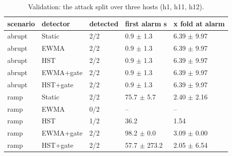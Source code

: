\begin{table}[t]
\centering\small
\caption{Validation: the attack split over three hosts (h1, h11, h12).}\label{tab:distributed}
\begin{tabular}{lllll}
\toprule
scenario & detector & detected & first alarm s & x fold at alarm \\
\midrule
abrupt & Static & 2/2 & 0.9 $\pm$ 1.3 & 6.39 $\pm$ 9.97 \\
abrupt & EWMA & 2/2 & 0.9 $\pm$ 1.3 & 6.39 $\pm$ 9.97 \\
abrupt & HST & 2/2 & 0.9 $\pm$ 1.3 & 6.39 $\pm$ 9.97 \\
abrupt & EWMA+gate & 2/2 & 0.9 $\pm$ 1.3 & 6.39 $\pm$ 9.97 \\
abrupt & HST+gate & 2/2 & 0.9 $\pm$ 1.3 & 6.39 $\pm$ 9.97 \\
ramp & Static & 2/2 & 75.7 $\pm$ 5.7 & 2.40 $\pm$ 2.16 \\
ramp & EWMA & 0/2 & -- & -- \\
ramp & HST & 1/2 & 36.2 & 1.54 \\
ramp & EWMA+gate & 2/2 & 98.2 $\pm$ 0.0 & 3.09 $\pm$ 0.00 \\
ramp & HST+gate & 2/2 & 57.7 $\pm$ 273.2 & 2.05 $\pm$ 6.54 \\
\bottomrule
\end{tabular}
\end{table}
